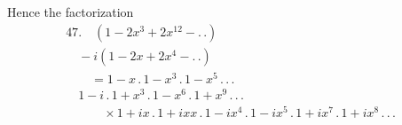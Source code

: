 Hence the factorization
\[
\begin{gathered}
47.\quad (1-2x^3+2x^{12}- .\,.)\\[8pt]\quad{}-i(1-2x+2x^4- .\,.)\\[8pt]
\qquad=1-x\,.\,1-x^3\,.\,1-x^5\,.\,.\,.\,\\[8pt]\quad{}
1-i\,.\,1+x^3\,.\,1-x^6\,.\,1+x^9\,.\,.\,.\\[8pt]
\qquad\quad\times1+ix\,.\,1+ixx\,.\,1-ix^4\,.\,1-ix^5\,.\,1+ix^7\,.\,1+ix^8\,.\,.\,.
\end{gathered}
\]
\clearpage
\endgroup
